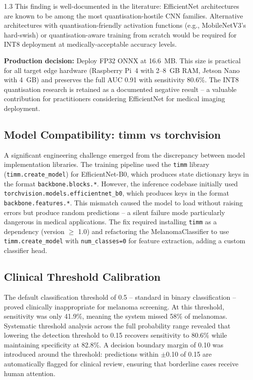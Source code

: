 \begin{spacing}{1.3}
This finding is well-documented in the literature: EfficientNet architectures are known to be among the most quantisation-hostile CNN families. Alternative architectures with quantisation-friendly activation functions (e.g., MobileNetV3's hard-swish) or quantisation-aware training from scratch would be required for INT8 deployment at medically-acceptable accuracy levels.

\textbf{Production decision:} Deploy FP32 ONNX at 16.6~MB. This size is practical for all target edge hardware (Raspberry Pi~4 with 2--8~GB RAM, Jetson Nano with 4~GB) and preserves the full AUC 0.91 with sensitivity 80.6\%. The INT8 quantisation research is retained as a documented negative result -- a valuable contribution for practitioners considering EfficientNet for medical imaging deployment.

\subsection{Model Compatibility: timm vs torchvision}

\label{sec:timm_issue}
A significant engineering challenge emerged from the discrepancy between model implementation libraries. The training pipeline used the \texttt{timm} library (\texttt{timm.create\_model}) for EfficientNet-B0, which produces state dictionary keys in the format \texttt{backbone.blocks.*}. However, the inference codebase initially used \texttt{torchvision.models.efficientnet\_b0}, which produces keys in the format \texttt{backbone.features.*}. This mismatch caused the model to load without raising errors but produce random predictions -- a silent failure mode particularly dangerous in medical applications. The fix required installing \texttt{timm} as a dependency (version $\geq$ 1.0) and refactoring the MelanomaClassifier to use \texttt{timm.create\_model} with \texttt{num\_classes=0} for feature extraction, adding a custom classifier head.

\subsection{Clinical Threshold Calibration}

\label{sec:threshold_calibration}
The default classification threshold of 0.5 -- standard in binary classification -- proved clinically inappropriate for melanoma screening. At this threshold, sensitivity was only 41.9\%, meaning the system missed 58\% of melanomas. Systematic threshold analysis across the full probability range revealed that lowering the detection threshold to 0.15 recovers sensitivity to 80.6\% while maintaining specificity at 82.8\%. A decision boundary margin of 0.10 was introduced around the threshold: predictions within $\pm$0.10 of 0.15 are automatically flagged for clinical review, ensuring that borderline cases receive human attention.


\end{spacing}
